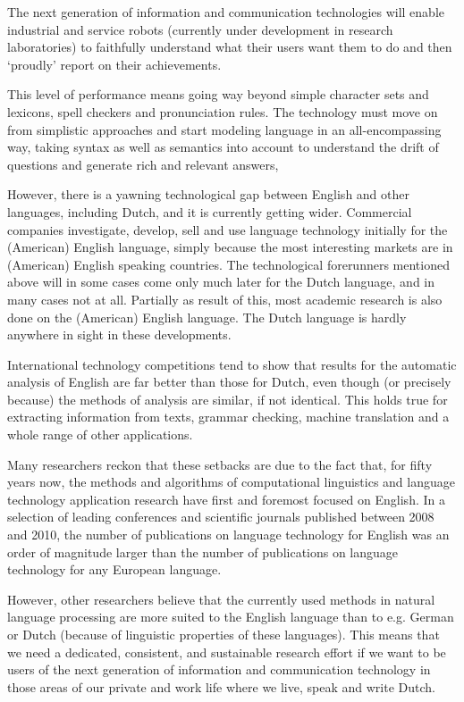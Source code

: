 \begin{multicols}{2}
The next generation of information and communication technologies will enable industrial and service robots (currently under development in research laboratories) to faithfully understand what their users want them to do and then `proudly' report on their achievements.

This level of performance means going way beyond simple character sets and lexicons, spell checkers and pronunciation rules. The technology must move on from simplistic approaches and start modeling language in an all-encompassing way, taking syntax as well as semantics into account to understand the drift of questions and generate rich and relevant answers,

However, there is a yawning technological gap between English and other languages, including Dutch, and it is currently getting wider. Commercial companies investigate, develop, sell and use language technology initially for the (American) English language, simply because the most interesting markets are in (American) English speaking countries. The technological forerunners mentioned above will in some cases come only much later for  the Dutch language, and in many cases not at all. Partially as result of this, most academic research is also done on the (American) English language.   The Dutch language is hardly anywhere in sight in these developments.

International technology competitions tend to show that results for the automatic analysis of English are far better than those for Dutch, even though (or precisely because) the methods of analysis are similar, if not identical. This holds true for extracting information from texts, grammar checking, machine translation and a whole range of other applications.

Many researchers reckon that these setbacks are due to the fact that, for fifty years now, the methods and algorithms of computational linguistics and language technology application research have first and foremost focused on English. In a selection of leading conferences and scientific journals published between 2008 and 2010, the number of publications on language technology for English was an order of magnitude larger than the number of publications on language technology for any European language.

However, other researchers believe that the currently used methods in natural language processing are more suited to the English language than to e.g. German or Dutch (because of linguistic properties of these languages). This means that we need a dedicated, consistent, and sustainable research effort if we want to be users of the next generation of information and communication technology in those areas of our private and work life where we live, speak and write Dutch.


\end{multicols}
